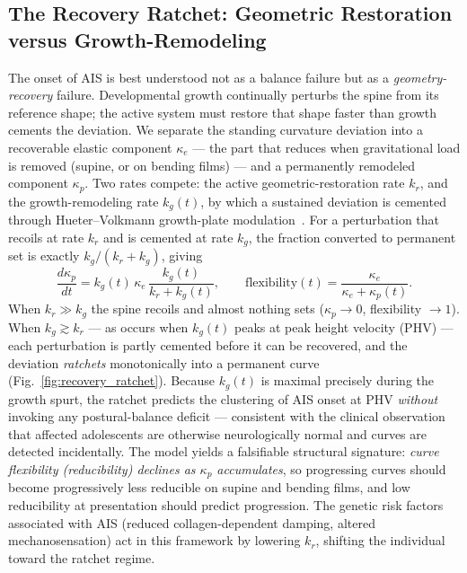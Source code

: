 \subsection{The Recovery Ratchet: Geometric Restoration versus Growth-Remodeling}

The onset of AIS is best understood not as a balance failure but as a \emph{geometry-recovery} failure. Developmental growth continually perturbs the spine from its reference shape; the active system must restore that shape faster than growth cements the deviation. We separate the standing curvature deviation into a recoverable elastic component $\kappa_e$ --- the part that reduces when gravitational load is removed (supine, or on bending films) --- and a permanently remodeled component $\kappa_p$. Two rates compete: the active geometric-restoration rate $k_r$, and the growth-remodeling rate $k_g(t)$, by which a sustained deviation is cemented through Hueter--Volkmann growth-plate modulation~\cite{stokes2007growth, villemure2009growth}. For a perturbation that recoils at rate $k_r$ and is cemented at rate $k_g$, the fraction converted to permanent set is exactly $k_g/(k_r+k_g)$, giving
\begin{equation}
\frac{d\kappa_p}{dt} = k_g(t)\,\kappa_e\,\frac{k_g(t)}{k_r + k_g(t)}, \qquad \mathrm{flexibility}(t) = \frac{\kappa_e}{\kappa_e + \kappa_p(t)}.
\label{eq:recovery_ratchet}
\end{equation}
When $k_r \gg k_g$ the spine recoils and almost nothing sets ($\kappa_p \to 0$, flexibility $\to 1$). When $k_g \gtrsim k_r$ --- as occurs when $k_g(t)$ peaks at peak height velocity (PHV) --- each perturbation is partly cemented before it can be recovered, and the deviation \emph{ratchets} monotonically into a permanent curve (Fig.~\ref{fig:recovery_ratchet}). Because $k_g(t)$ is maximal precisely during the growth spurt, the ratchet predicts the clustering of AIS onset at PHV \emph{without} invoking any postural-balance deficit --- consistent with the clinical observation that affected adolescents are otherwise neurologically normal and curves are detected incidentally. The model yields a falsifiable structural signature: \emph{curve flexibility (reducibility) declines as $\kappa_p$ accumulates}, so progressing curves should become progressively less reducible on supine and bending films, and low reducibility at presentation should predict progression. The genetic risk factors associated with AIS (reduced collagen-dependent damping, altered mechanosensation) act in this framework by lowering $k_r$, shifting the individual toward the ratchet regime.

